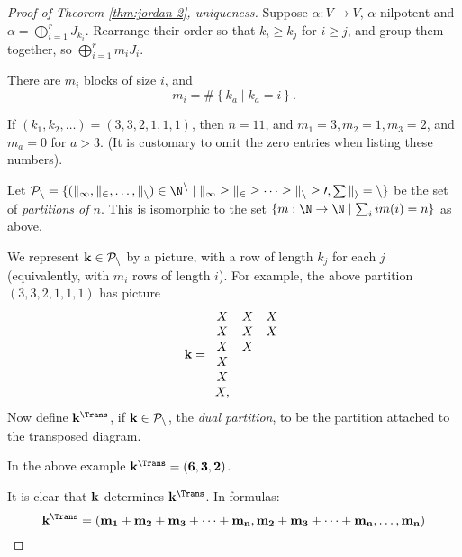 \begin{proof}
	[Proof of Theorem \ref{thm:jordan-2}, uniqueness] Suppose $\alpha:V\to V$, $\alpha$ nilpotent and $\alpha=\bigoplus_{i=1}^r J_{k_i}$. Rearrange their order so that $k_i\geq k_j$ for $i\geq j$, and group them together, so $\bigoplus_{i=1}^r m_i J_i$.
	
	There are $m_i$ blocks of size $i$, and
	\begin{equation*}
		m_i = \#\left\{k_a \mid k_a = i\right\}. \tag{$*$}
	\end{equation*}
	\vspace{-9pt}
	\begin{example}
		If $(k_1,k_2,\dots) = (3,3,2,1,1,1)$, then $n=11$, and $m_1 = 3, m_2 =1, m_3 =2$, and $ m_a = 0 $ for $a > 3$. (It is customary to omit the zero entries when listing these numbers).
	\end{example}

	\begin{definition}
		Let $\cal{P}_n = \{ (k_1,k_2, \dots, k_n) \in \N^n \mid k_1 \geq k_2 \geq \dots \geq k_n \geq 0, \sum k_i = n\}$ be the set of \emph{partitions of $n$}. This is isomorphic to the set $\{ m : \N \to \N \mid \sum_i im(i) = n \}$ as above.
	\end{definition}

		\pagebreak

	We represent $\bf{k}\in\cal{P}_n$ by a picture, with a row of length $k_j$ for each $j$ (equivalently, with $m_i$ rows of length $i$). For example, the above partition $(3,3,2,1,1,1)$ has picture
	\begin{equation*}
		\bf{k} =
		\begin{array}{ccc}
			X & X & X \\
			X & X & X \\
			X & X \\
			X \\
			X \\
			X,
		\end{array}
	\end{equation*}
	Now define $\bf{k}^\Trans$, if $\bf{k}\in\cal{P}_n$, the \emph{dual partition}, to be the partition attached to the transposed diagram.

	In the above example $\bf{k}^\Trans = (6,3,2)$. 
	
	It is clear that $\bf{k}$ determines $\bf{k}^\Trans$. In formulas:
	\begin{equation*}
		\bf{k}^\Trans = (m_1+m_2+m_3+\dots+m_n, m_2 + m_3 + \dots + m_n, \dots, m_n)
	\end{equation*}


\end{proof}
